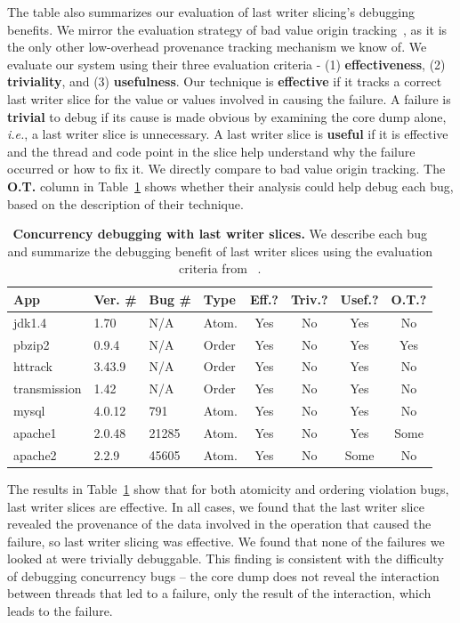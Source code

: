 \documentclass[preprint,9pt]{sigplanconf}
\begin{document}
The table also summarizes our evaluation of last writer slicing's debugging
benefits.  We mirror the evaluation strategy of bad value origin
tracking~\cite{badapples}, as it is the only other low-overhead provenance
tracking mechanism we know of.  We evaluate our system using their three
evaluation criteria - (1) {\bf effectiveness}, (2) {\bf triviality}, and (3)
{\bf usefulness}.  Our technique is {\bf effective} if it tracks a correct last
writer slice for the value or values involved in causing the failure.  A failure is {\bf
trivial} to debug if its cause is made obvious by examining the core dump
alone, {\em i.e.}, a last writer slice is unnecessary.  A last writer slice is
{\bf useful} if it is effective and the thread and code point in the slice help
understand why the failure occurred or how to fix it.   We directly compare to
bad value origin tracking.    The {\bf O.T.} column in Table~\ref{tab:bugs}
shows  whether their analysis could help debug each bug, based on the
description of their technique.

\begin{table}
\scriptsize
\centering
\begin{tabular}{l|ll|l|ccc|c}
{\bf App} & {\bf Ver. \#} & {\bf Bug \#} &{\bf Type} & {\bf Eff.?} & {\bf Triv.?} & {\bf Usef.?} & {\bf O.T.?}\\ \hline
jdk1.4 &  1.70   &  N/A     & Atom.  &Yes  &No    &Yes   & No  \\%
pbzip2 &  0.9.4  &  N/A     & Order  &Yes  &No    &Yes   & Yes \\
httrack& 3.43.9  &  N/A     & Order  &Yes  &No    &Yes   & No  \\%
transmission & 1.42 & N/A   & Order  &Yes  &No    &Yes   & No  \\
mysql  &  4.0.12 &  791     & Atom.  &Yes  &No    &Yes   & No  \\%
apache1&  2.0.48 &  21285   & Atom.  &Yes  &No    &Yes   & Some \\%
apache2&  2.2.9 &  45605    & Atom.  &Yes  &No    &Some  & No \\%
\end{tabular}
\caption{\label{tab:bugs}{\bf Concurrency debugging with last writer slices.} We describe each bug and summarize the debugging benefit of last writer slices using the evaluation criteria from ~\cite{badapples}.  }
\normalsize
\end{table}

The results in Table~\ref{tab:bugs} show that for both atomicity and ordering
violation bugs, last writer slices are effective.  In all cases, we found that
the last writer slice revealed the provenance of the data involved in the
operation that caused the failure, so last writer slicing was effective.  We
found that none of the failures we looked at were trivially debuggable.  This
finding is consistent with the difficulty of debugging concurrency bugs -- the
core dump does not reveal the interaction between threads that led to a
failure, only the result of the interaction, which leads to the failure.  
\end{document}
